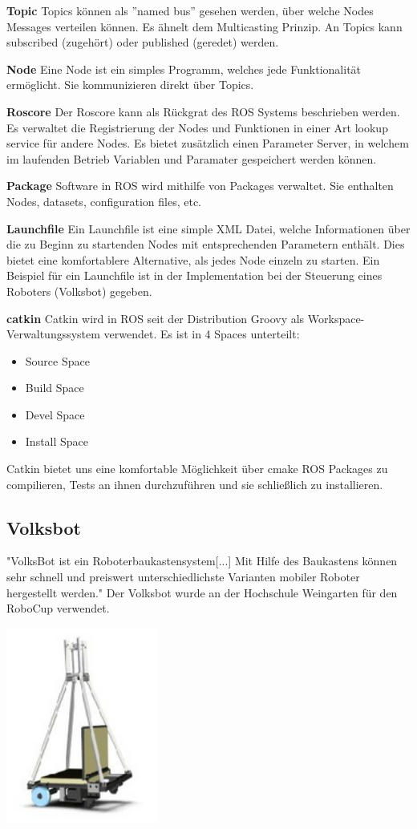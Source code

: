 \documentclass[12pt]{article}
\begin{document}
{\bf Topic} Topics können als ''named bus'' gesehen werden, über welche Nodes Messages verteilen können. Es ähnelt dem Multicasting Prinzip. An Topics kann subscribed (zugehört) oder published (geredet) werden.

{\bf Node} Eine Node ist ein simples Programm, welches jede Funktionalität ermöglicht.  Sie kommunizieren direkt über Topics.

{\bf Roscore} Der Roscore kann als Rückgrat des ROS Systems beschrieben werden. Es verwaltet die Registrierung der Nodes und Funktionen in einer Art lookup service für andere Nodes. Es bietet zusätzlich einen Parameter Server, in welchem im laufenden Betrieb Variablen und Paramater gespeichert werden können.

{\bf Package} Software in ROS wird mithilfe von Packages verwaltet.
Sie enthalten Nodes, datasets, configuration files, etc.

{\bf Launchfile} Ein Launchfile ist eine simple XML Datei, welche Informationen über die zu Beginn zu startenden Nodes mit entsprechenden Parametern enthält.
Dies bietet eine komfortablere Alternative, als jedes Node einzeln zu starten.
Ein Beispiel für ein Launchfile ist in der Implementation bei der Steuerung eines Roboters (Volksbot) gegeben. \cite{SLAM}
 
{\bf catkin} Catkin wird in ROS seit der Distribution Groovy als Workspace-Verwaltungssystem verwendet.
Es ist in 4 Spaces unterteilt:
\begin{itemize}
\item Source Space
\item Build Space
\item Devel Space
\item Install Space
\end{itemize}
Catkin bietet uns eine komfortable Möglichkeit über cmake ROS Packages zu compilieren, Tests an ihnen durchzuführen und sie schließlich zu installieren.

\subsection{Volksbot}
\parbox{8cm}{
"VolksBot ist ein Roboterbaukastensystem[...]
Mit Hilfe des Baukastens können sehr schnell und preiswert unterschiedlichste Varianten mobiler Roboter hergestellt werden." \cite{Volksbot}
Der Volksbot wurde an der Hochschule Weingarten für den RoboCup verwendet.
}\hfill
\parbox{5cm}{
\includegraphics[width=5cm]{Volksbot.jpg} \cite{Volksbotpic}
}
\end{document}
